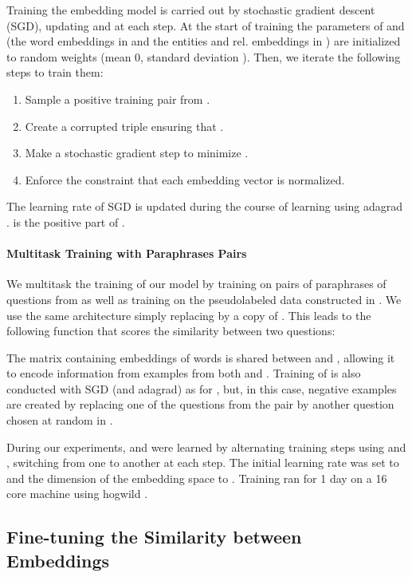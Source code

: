 \documentclass[runningheads,a4paper]{llncs}
\begin{document}
Training the embedding model is carried out by stochastic gradient descent (SGD), updating  and  at each step. At the start of training the parameters of  and 
(the  word embeddings in  and the  entities and rel. embeddings in ) are initialized to random weights (mean 0, standard deviation ).
Then, we iterate the following steps to train them:
\begin{enumerate}
\item Sample a positive training pair  from .
\item Create a corrupted triple  ensuring that .
\item Make a stochastic gradient step to minimize .
\item Enforce the constraint that each embedding vector is normalized.
\end{enumerate}
The learning rate of SGD is updated during the course of learning using {\sc adagrad} \cite{duchi2011adaptive}.  is the positive part of .


\paragraph{Multitask Training with Paraphrases Pairs}
We multitask the training of our model by training on pairs of paraphrases of questions  from  as well as training on the pseudolabeled data constructed in .
We use the same architecture simply replacing  by a copy of . 
This leads to the following function that scores the similarity between two questions:

The matrix  containing embeddings of words is shared between  and , allowing it to encode information from examples from both  and .
Training of  is also conducted with SGD (and {\sc adagrad}) as for , but, in this case, negative examples are created by replacing one of the questions from the pair by another question chosen at random in .

During our experiments,  and  were learned by alternating training steps using  and , switching from one to another at each step.
The initial learning rate was set to  and the dimension  of the embedding space to . Training ran for 1 day on a 16 core machine using {\sc hogwild} \cite{recht2011hogwild}.



\subsection{Fine-tuning the Similarity between Embeddings}
\end{document}

